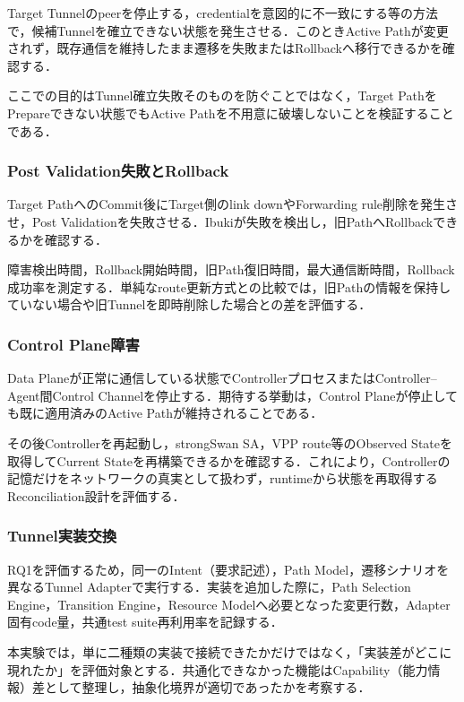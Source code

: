 \documentclass[11pt,a4paper,twoside]{ltjsarticle}
\begin{document}
Target Tunnelのpeerを停止する，credentialを意図的に不一致にする等の方法で，候補Tunnelを確立できない状態を発生させる．このときActive Pathが変更されず，既存通信を維持したまま遷移を失敗またはRollbackへ移行できるかを確認する．

ここでの目的はTunnel確立失敗そのものを防ぐことではなく，Target PathをPrepareできない状態でもActive Pathを不用意に破壊しないことを検証することである．

\subsubsection{Post Validation失敗とRollback}

Target PathへのCommit後にTarget側のlink downやForwarding rule削除を発生させ，Post Validationを失敗させる．Ibukiが失敗を検出し，旧PathへRollbackできるかを確認する．

障害検出時間，Rollback開始時間，旧Path復旧時間，最大通信断時間，Rollback成功率を測定する．単純なroute更新方式との比較では，旧Pathの情報を保持していない場合や旧Tunnelを即時削除した場合との差を評価する．

\subsubsection{Control Plane障害}

Data Planeが正常に通信している状態でControllerプロセスまたはController--Agent間Control Channelを停止する．期待する挙動は，Control Planeが停止しても既に適用済みのActive Pathが維持されることである．

その後Controllerを再起動し，strongSwan SA，VPP route等のObserved Stateを取得してCurrent Stateを再構築できるかを確認する．これにより，Controllerの記憶だけをネットワークの真実として扱わず，runtimeから状態を再取得するReconciliation設計を評価する．

\subsubsection{Tunnel実装交換}

RQ1を評価するため，同一のIntent（要求記述），Path Model，遷移シナリオを異なるTunnel Adapterで実行する．実装を追加した際に，Path Selection Engine，Transition Engine，Resource Modelへ必要となった変更行数，Adapter固有code量，共通test suite再利用率を記録する．

本実験では，単に二種類の実装で接続できたかだけではなく，「実装差がどこに現れたか」を評価対象とする．共通化できなかった機能はCapability（能力情報）差として整理し，抽象化境界が適切であったかを考察する．
\end{document}
